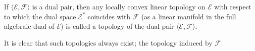If $\langle \mathcal{E}, \mathcal{F} \rangle$ is a dual pair, then any locally convex linear topology on $\mathcal{E}$ with respect to which the dual space $\mathcal{E}^*$ coincides with $\mathcal{F}$ (as a linear manifold in the full algebraic dual of $\mathcal{E}$) is called a topology of the dual pair $\langle \mathcal{E}, \mathcal{F} \rangle$.

It is clear that such topologies always exist; the topology induced by $\mathcal{F}$
